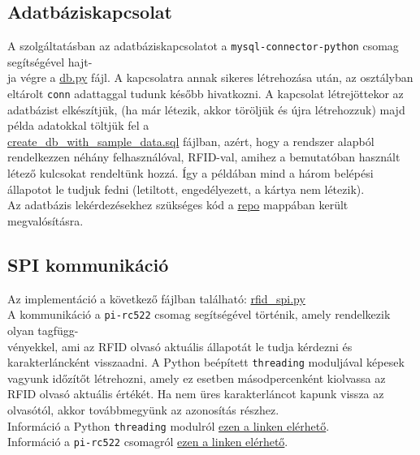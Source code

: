 \documentclass[11pt, a4paper]{article}
\begin{document}
		\subsection{Adatbáziskapcsolat}
			\begin{flushleft}
				\justifying
				A szolgáltatásban az adatbáziskapcsolatot a \texttt{mysql-connector-python} csomag segítségével hajt-\\ja végre a
				\color{blue}
				\href{https://github.com/mark182182/GKLB_INTM020_mikroelektromechanikai_rendszerek/blob/main/db/db.py}{db.py}
				\color{black} fájl. A kapcsolatra annak sikeres létrehozása után, az osztályban eltárolt \texttt{conn} adattaggal tudunk később hivatkozni. A kapcsolat létrejöttekor az adatbázist elkészítjük, (ha már létezik, akkor töröljük és újra létrehozzuk) majd példa adatokkal töltjük fel a \\ \color{blue}
				\href{https://github.com/mark182182/GKLB_INTM020_mikroelektromechanikai_rendszerek/blob/main/db/create_db_with_sample_data.sql}{create\_db\_with\_sample\_data.sql}
				\color{black} fájlban, azért, hogy a rendszer alapból rendelkezzen néhány felhasználóval, RFID-val, amihez a bemutatóban használt létező kulcsokat rendeltünk hozzá. Így a példában mind a három belépési állapotot le tudjuk fedni (letiltott, engedélyezett, a kártya nem létezik). \\
				Az adatbázis lekérdezésekhez szükséges kód a 
				\color{blue}
				\href{https://github.com/mark182182/GKLB_INTM020_mikroelektromechanikai_rendszerek/tree/main/repo}{repo}
				\color{black} mappában került megvalósításra.
			\end{flushleft}

		\subsection{SPI kommunikáció}
			\begin{flushleft}
				\justifying
				Az implementáció a következő fájlban található:
				\color{blue}
				\href{https://github.com/mark182182/GKLB_INTM020_mikroelektromechanikai_rendszerek/blob/main/raspi/rfid_spi.py}{rfid\_spi.py}
				\color{black} \\
				A kommunikáció a \texttt{pi-rc522} csomag segítségével történik, amely rendelkezik olyan tagfügg-\\vényekkel, ami az RFID olvasó aktuális állapotát le tudja kérdezni és karakterláncként visszaadni.
				A Python beépített \texttt{threading} moduljával képesek vagyunk időzítőt létrehozni, amely ez esetben másodpercenként kiolvassa az RFID olvasó aktuális értékét. Ha nem üres karakterláncot kapunk vissza az olvasótól, akkor továbbmegyünk az azonosítás részhez. \\
				Információ a Python \texttt{threading} modulról
				\color{blue}
				\href{https://docs.python.org/3/library/threading.html}{ezen a linken elérhető}\color{black}. \\
				Információ a \texttt{pi-rc522} csomagról
				\color{blue}
				\href{https://github.com/ondryaso/pi-rc522}{ezen a linken elérhető}\color{black}.
			\end{flushleft}
			
\end{document}
